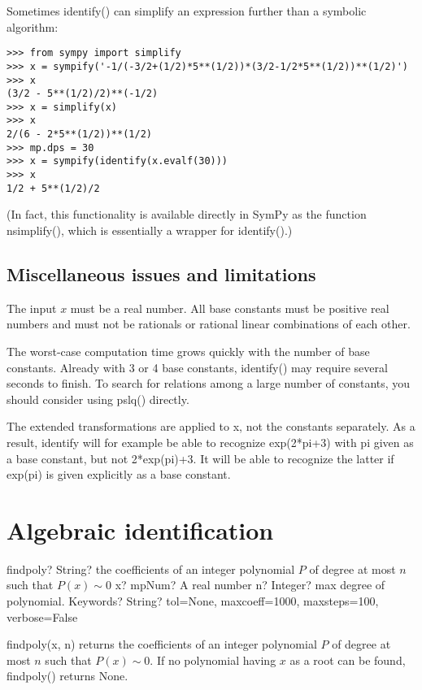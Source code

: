 Sometimes identify() can simplify an expression further than a symbolic algorithm:

\begin{lstlisting}
>>> from sympy import simplify
>>> x = sympify('-1/(-3/2+(1/2)*5**(1/2))*(3/2-1/2*5**(1/2))**(1/2)')
>>> x
(3/2 - 5**(1/2)/2)**(-1/2)
>>> x = simplify(x)
>>> x
2/(6 - 2*5**(1/2))**(1/2)
>>> mp.dps = 30
>>> x = sympify(identify(x.evalf(30)))
>>> x
1/2 + 5**(1/2)/2
\end{lstlisting}


(In fact, this functionality is available directly in SymPy as the function nsimplify(), which is essentially a wrapper for identify().)


\subsection{Miscellaneous issues and limitations}

The input $x$ must be a real number. All base constants must be positive real numbers and must not be rationals or rational linear combinations of each other.

The worst-case computation time grows quickly with the number of base constants. Already with 3 or 4 base constants, identify() may require several seconds to finish. To search for relations among a large number of constants, you should consider using pslq() directly.

The extended transformations are applied to x, not the constants separately. As a result, identify will for example be able to recognize exp(2*pi+3) with pi given as a base constant, but not 2*exp(pi)+3. It will be able to recognize the latter if exp(pi) is given explicitly as a base constant.


\newpage
\section{Algebraic identification}

\begin{mpFunctionsExtract}
	\mpFunctionThree
	{findpoly? String? the coefficients of an integer polynomial $P$ of degree at most $n$ such that $P(x) \sim 0$}
	{x? mpNum? A real number}
	{n? Integer? max degree of polynomial.}	
	{Keywords? String?  tol=None, maxcoeff=1000, maxsteps=100, verbose=False}	
\end{mpFunctionsExtract}


\vpara
findpoly(x, n) returns the coefficients of an integer polynomial $P$ of degree at most $n$ such that $P(x) \sim 0$. If no polynomial having $x$ as a root can be found, findpoly() returns None.


